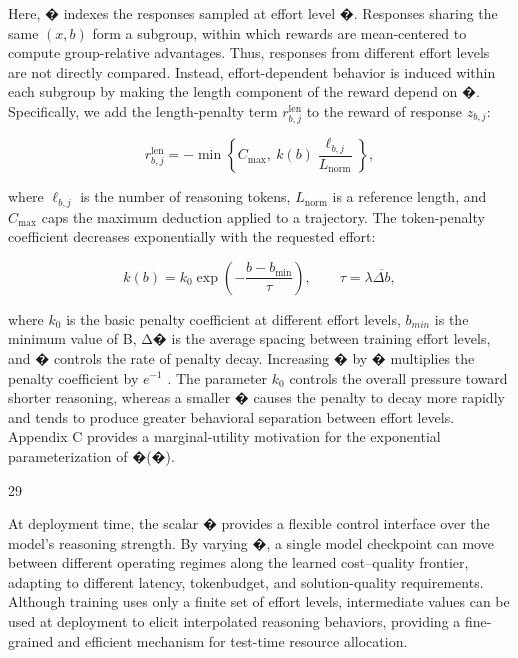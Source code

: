 \documentclass[
  10
]{article}
\begin{document}
Here, � indexes the responses sampled at effort level �. Responses
sharing the same \(( x , b )\) form a subgroup, within which rewards are
mean-centered to compute group-relative advantages. Thus, responses from
different effort levels are not directly compared. Instead,
effort-dependent behavior is induced within each subgroup by making the
length component of the reward depend on �. Specifically, we add the
length-penalty term \(r _ { b , j } ^ { \mathrm { l e n } }\) to the
reward of response \(z _ { b , j } \mathrm { : }\)

\[
r _ { b , j } ^ { \mathrm { l e n } } = - \operatorname* { m i n } \left\{ C _ { \mathrm { m a x } } , \ k ( b ) \frac { \ell _ { b , j } } { L _ { \mathrm { n o r m } } } \right\} ,\tag{9}
\]

where \(\ell _ { b , j }\) is the number of reasoning tokens,
\(L _ { \mathrm { n o r m } }\) is a reference length, and
\(C _ { \mathrm { m a x } }\) caps the maximum deduction applied to a
trajectory. The token-penalty coefficient decreases exponentially with
the requested effort:

\[
k ( b ) = k _ { 0 } \exp \left( - \frac { b - b _ { \mathrm { m i n } } } { \tau } \right) , \qquad \tau = \lambda \overline { { \Delta b } } ,\tag{10}
\]

where \(k _ { 0 }\) is the basic penalty coefficient at different effort
levels, \(b _ { m i n }\) is the minimum value of B, Δ� is the average
spacing between training effort levels, and � controls the rate of
penalty decay. Increasing � by � multiplies the penalty coefficient by
\(e ^ { - 1 }\) . The parameter \(k _ { 0 }\) controls the overall
pressure toward shorter reasoning, whereas a smaller � causes the
penalty to decay more rapidly and tends to produce greater behavioral
separation between effort levels. Appendix C provides a marginal-utility
motivation for the exponential parameterization of �(�).

29

At deployment time, the scalar � provides a flexible control interface
over the model's reasoning strength. By varying �, a single model
checkpoint can move between different operating regimes along the
learned cost--quality frontier, adapting to different latency,
tokenbudget, and solution-quality requirements. Although training uses
only a finite set of effort levels, intermediate values can be used at
deployment to elicit interpolated reasoning behaviors, providing a
fine-grained and efficient mechanism for test-time resource allocation.
\end{document}
